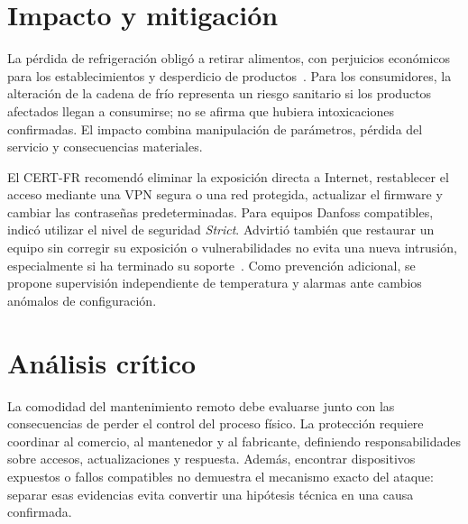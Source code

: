 \section{Impacto y mitigación}
La pérdida de refrigeración obligó a retirar alimentos,
con perjuicios económicos para los establecimientos
y desperdicio de productos~\cite{onyphe2026francia}.
Para los consumidores, la alteración de la cadena
de frío representa un riesgo sanitario si los productos
afectados llegan a consumirse; no se afirma que hubiera
intoxicaciones confirmadas.
El impacto combina manipulación de parámetros,
pérdida del servicio y consecuencias materiales.

El CERT-FR recomendó eliminar la exposición directa
a Internet, restablecer el acceso mediante una VPN
segura o una red protegida, actualizar el firmware
y cambiar las contraseñas predeterminadas.
Para equipos Danfoss compatibles, indicó utilizar
el nivel de seguridad \textit{Strict}.
Advirtió también que restaurar un equipo sin corregir
su exposición o vulnerabilidades no evita una nueva
intrusión, especialmente si ha terminado su
soporte~\cite{certfr2026frigorificos}.
Como prevención adicional, se propone supervisión
independiente de temperatura y alarmas ante cambios
anómalos de configuración.

\section{Análisis crítico}
La comodidad del mantenimiento remoto debe evaluarse
junto con las consecuencias de perder el control
del proceso físico. La protección requiere coordinar
al comercio, al mantenedor y al fabricante, definiendo
responsabilidades sobre accesos, actualizaciones
y respuesta.
Además, encontrar dispositivos expuestos o fallos
compatibles no demuestra el mecanismo exacto del
ataque: separar esas evidencias evita convertir
una hipótesis técnica en una causa confirmada.